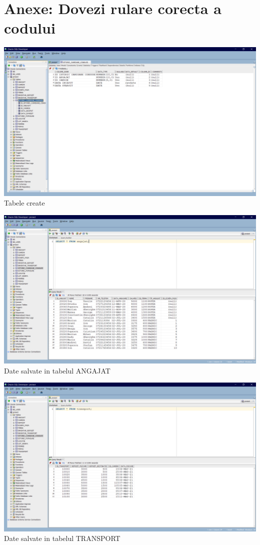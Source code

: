 \documentclass[12pt, a4paper]{article}
\begin{document}
\newpage
\section{Anexe: Dovezi rulare corecta a codului}

\includegraphics[width=\textwidth]{tabele.png}
\label{tabele_create}
\centering Tabele create

\includegraphics[width=\textwidth]{date_tabel_ang.png}
\label{date_tabel_ang}
\centering Date salvate in tabelul ANGAJAT

\includegraphics[width=\textwidth]{date_tabel_trans.png}
\label{date_tabel_trans}
\centering Date salvate in tabelul TRANSPORT
\end{document}
